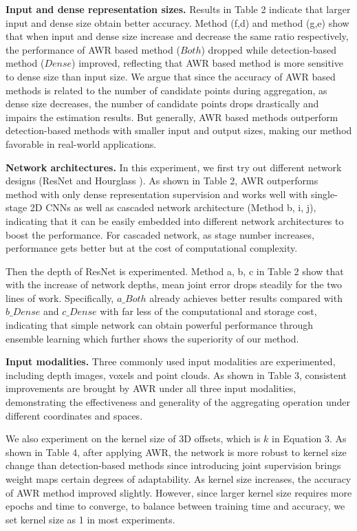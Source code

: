\documentclass[letterpaper]{article} \usepackage{aaai20}  \usepackage{times}  \usepackage{helvet} \usepackage{courier}  \usepackage[hyphens]{url}  \usepackage{graphicx} \usepackage{amsmath}
\begin{document}
\textbf{Input and dense representation sizes.} Results in Table 2 indicate that larger input and dense size obtain better accuracy. Method (f,d) and method (g,e) show that when input and dense size increase and decrease the same ratio respectively, the performance of AWR based method ($Both$) dropped while detection-based method ($Dense$) improved, reflecting that AWR based method is more sensitive to dense size than input size. We argue that since the accuracy of AWR based methods is related to the number of candidate points during aggregation, as dense size decreases, the number of candidate points drops drastically and impairs the estimation results. But generally, AWR based methods outperform detection-based methods with smaller input and output sizes, making our method favorable in real-world applications.

\textbf{Network architectures.} In this experiment, we first try out different network designs (ResNet \cite{resnet} and Hourglass \cite{hourglass}). As shown in Table 2, AWR outperforms method with only dense representation supervision and works well with single-stage 2D CNNs as well as cascaded network architecture (Method b, i, j), indicating that it can be easily embedded into different network architectures to boost the performance. For cascaded network, as stage number increases, performance gets better but at the cost of computational complexity. 

Then the depth of ResNet is experimented. Method a, b, c in Table 2 show that with the increase of network depths, mean joint error drops steadily for the two lines of work. Specifically, $a\_Both$ already achieves better results compared with $b\_Dense$ and $c\_Dense$ with far less of the computational and storage cost, indicating that simple network can obtain powerful performance through ensemble learning which further shows the superiority of our method. 

\textbf{Input modalities.} Three commonly used input modalities are experimented, including depth images, voxels and point clouds. As shown in Table 3, consistent improvements are brought by AWR under all three input modalities, demonstrating the effectiveness and generality of the aggregating operation under different coordinates and spaces.

We also experiment on the kernel size of 3D offsets, which is $k$ in Equation 3. As shown in Table 4, after applying AWR, the network is more robust to kernel size change than detection-based methods since introducing joint supervision brings weight maps certain degrees of adaptability. As kernel size increases, the accuracy of AWR method improved slightly. However, since larger kernel size requires more epochs and time to converge, to balance between training time and accuracy, we set kernel size as 1 in most experiments.
\end{document}
